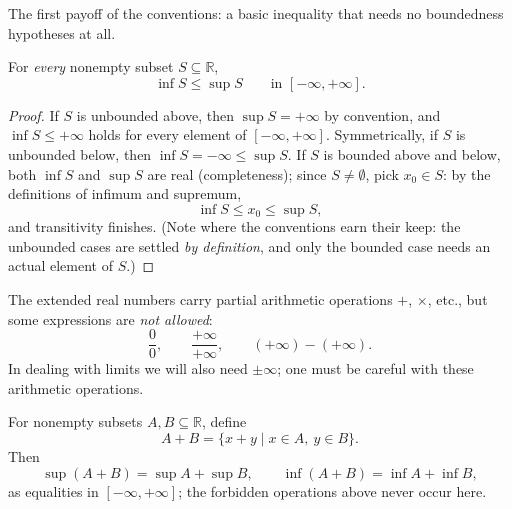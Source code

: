 \documentclass[11pt]{report}
\begin{document}
The first payoff of the conventions: a basic inequality that needs no boundedness hypotheses at all.

\begin{propbox}
For \emph{every} nonempty subset $S \subseteq \mathbb{R}$,
\[
\inf S \leq \sup S \qquad \text{in } [-\infty, +\infty].
\]
\end{propbox}

\begin{proof}
If $S$ is unbounded above, then $\sup S = +\infty$ by convention, and $\inf S \leq +\infty$ holds for every element of $[-\infty,+\infty]$. Symmetrically, if $S$ is unbounded below, then $\inf S = -\infty \leq \sup S$. If $S$ is bounded above and below, both $\inf S$ and $\sup S$ are real (completeness); since $S \neq \emptyset$, pick $x_0 \in S$: by the definitions of infimum and supremum,
\[
\inf S \leq x_0 \leq \sup S,
\]
and transitivity finishes. (Note where the conventions earn their keep: the unbounded cases are settled \emph{by definition}, and only the bounded case needs an actual element of $S$.)
\end{proof}

\begin{rembox}
The extended real numbers carry partial arithmetic operations $+$, $\times$, etc., but some expressions are \emph{not allowed}:
\[
\frac{0}{0}, \qquad \frac{+\infty}{+\infty}, \qquad (+\infty) - (+\infty).
\]
In dealing with limits we will also need $\pm\infty$; one must be careful with these arithmetic operations.
\end{rembox}

\begin{propbox}
For nonempty subsets $A, B \subseteq \mathbb{R}$, define
\[
A + B = \{x + y \mid x \in A,\ y \in B\}.
\]
Then
\[
\sup (A + B) = \sup A + \sup B, \qquad \inf (A+B) = \inf A + \inf B,
\]
as equalities in $[-\infty, +\infty]$; the forbidden operations above never occur here.
\end{propbox}
\end{document}
